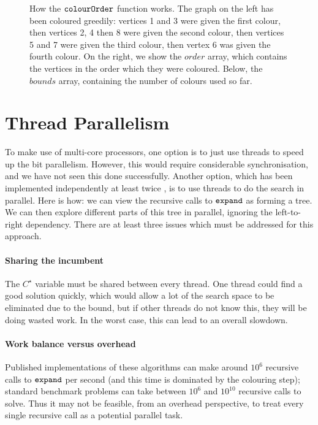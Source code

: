 \documentclass[a4paper]{article}
\newcommand{\Cbest}{C^\star}
\newcommand{\bounds}{\mathit{bounds}}
\newcommand{\order}{\mathit{order}}
\newcommand{\expand}{\FuncSty{expand}}
\newcommand{\colourOrder}{\FuncSty{colourOrder}}
\begin{document}
\begin{figure}[p]

    \caption[How the $\colourOrder$ function works]{How the $\colourOrder$ function works. The graph
        on the left has been coloured greedily: vertices 1 and 3 were given the first colour, then
        vertices 2, 4 then 8 were given the second colour, then vertices 5 and 7 were given the
        third colour, then vertex 6 was given the fourth colour. On the right, we show the $\order$
        array, which contains the vertices in the order which they were coloured. Below, the $\bounds$
        array, containing the number of colours used so far.}
    \label{figure:colourOrder}
\end{figure}

\section{Thread Parallelism}

To make use of multi-core processors, one option is to just use threads to speed up the bit
parallelism. However, this would require considerable synchronisation, and we have not seen this
done successfully. Another option, which has been implemented independently at least twice
\cite{McCreesh:2013,Depolli:2013,McCreesh:2014.parallel}, is to use threads to do the search in
parallel. Here is how: we can view the recursive calls to $\expand$ as forming a tree. We can then
explore different parts of this tree in parallel, ignoring the left-to-right dependency. There are
at least three issues which must be addressed for this approach.

\paragraph{Sharing the incumbent} The $\Cbest$ variable must be shared between every thread.  One
thread could find a good solution quickly, which would allow a lot of the search space to be
eliminated due to the bound, but if other threads do not know this, they will be doing wasted work.
In the worst case, this can lead to an overall slowdown.

\paragraph{Work balance versus overhead} Published implementations of these algorithms can make
around $10^6$ recursive calls to $\expand$ per second (and this time is dominated by the colouring
step); standard benchmark problems can take between $10^6$ and $10^{10}$ recursive calls to solve.
Thus it may not be feasible, from an overhead perspective, to treat every single recursive call as a
potential parallel task.
\end{document}

